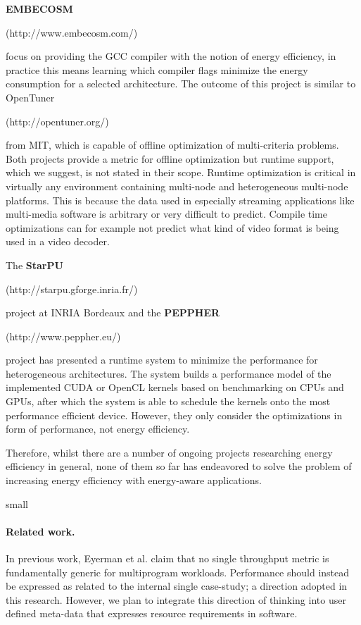 \documentclass{article}
\begin{document}
\textbf{EMBECOSM}\begin{small}{ (http://www.embecosm.com/)} \end{small} focus on providing the GCC compiler with the notion of energy efficiency, in practice this means learning which compiler flags minimize the energy consumption for a selected architecture. 
The outcome of this project is similar to OpenTuner \begin{small}{ (http://opentuner.org/)} \end{small} from MIT, which is capable of offline optimization of multi-criteria problems. 
Both projects provide a metric for offline optimization but runtime support, which we suggest, is not stated in their scope. 
Runtime optimization is critical in virtually any environment containing multi-node and heterogeneous multi-node platforms. 
This is because the data used in especially streaming applications like multi-media software is arbitrary or very difficult to predict. 
Compile time optimizations can for example not predict what kind of video format is being used in a video decoder.\smallskip

The \textbf{StarPU}\begin{small}{ (http://starpu.gforge.inria.fr/)} \end{small} project at INRIA Bordeaux and the \textbf{PEPPHER}\begin{small}{ (http://www.peppher.eu/)} \end{small} project has presented a runtime system to minimize the performance for heterogeneous architectures. 
The system builds a performance model of the implemented CUDA or OpenCL kernels based on benchmarking on CPUs and GPUs, after which the system is able to schedule the kernels onto the most performance efficient device. However, they only consider the optimizations in form of performance, not energy efficiency.\smallskip

Therefore, whilst there are a number of ongoing projects researching energy efficiency in general, none of them so far has endeavored to solve the problem of increasing energy efficiency with energy-aware applications.

 
{small}

\paragraph{Related work.}
In previous work, Eyerman et al. \cite{Eyerman:09} claim that no single throughput metric is fundamentally generic for multiprogram workloads. 
Performance should instead be expressed as related to the internal single case-study; a direction adopted in this research. 
However, we plan to integrate this direction of thinking into user defined meta-data that expresses resource requirements in software.\smallskip
\end{document}
